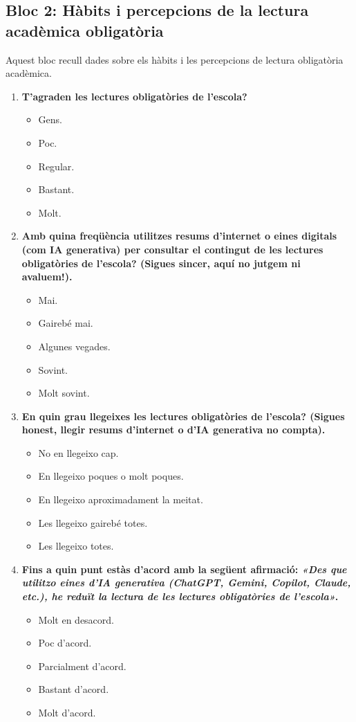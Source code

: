 \documentclass[12pt]{article}
\newcommand{\subsectiononumber}[1]{%
  \subsection*{#1}
  \phantomsection
}
\begin{document}
\subsectiononumber{Bloc 2: Hàbits i percepcions de la lectura acadèmica obligatòria}
Aquest bloc recull dades sobre els hàbits i les percepcions de lectura obligatòria acadèmica.

\begin{enumerate}
    \item \textbf{T'agraden les lectures obligatòries de l'escola?}
    \begin{itemize}
        \item[$\square$] Gens.
        \item[$\square$] Poc.
        \item[$\square$] Regular.
        \item[$\square$] Bastant.
        \item[$\square$] Molt.
    \end{itemize}

    \item \textbf{Amb quina freqüència utilitzes resums d'internet o eines digitals (com IA generativa) per consultar el contingut de les lectures obligatòries de l'escola? (Sigues sincer, aquí no jutgem ni avaluem!).}
    \begin{itemize}
        \item[$\square$] Mai.
        \item[$\square$] Gairebé mai.
        \item[$\square$] Algunes vegades.
        \item[$\square$] Sovint.
        \item[$\square$] Molt sovint.
    \end{itemize}

    \item \textbf{En quin grau llegeixes les lectures obligatòries de l'escola? (Sigues honest, llegir resums d'internet o d'IA generativa no compta).}
    \begin{itemize}
        \item[$\square$] No en llegeixo cap.
        \item[$\square$] En llegeixo poques o molt poques.
        \item[$\square$] En llegeixo aproximadament la meitat.
        \item[$\square$] Les llegeixo gairebé totes.
        \item[$\square$] Les llegeixo totes.
    \end{itemize}

    \item \textbf{Fins a quin punt estàs d'acord amb la següent afirmació: \textit{«Des que utilitzo eines d'IA generativa (ChatGPT, Gemini, Copilot, Claude, etc.), he reduït la lectura de les lectures obligatòries de l'escola»}.}
    \begin{itemize}
        \item[$\square$] Molt en desacord.
        \item[$\square$] Poc d'acord.
        \item[$\square$] Parcialment d'acord.
        \item[$\square$] Bastant d'acord.
        \item[$\square$] Molt d'acord.
    \end{itemize}


\end{enumerate}
\end{document}
